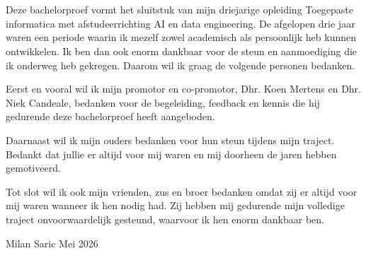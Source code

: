 
\chapter*{}%
\label{ch:voorwoord}


Deze bachelorproef vormt het sluitstuk van mijn driejarige opleiding Toegepaste informatica met afstudeerrichting AI en data engineering. De afgelopen drie jaar waren een periode waarin ik mezelf zowel academisch als persoonlijk heb kunnen ontwikkelen. Ik ben dan ook enorm dankbaar voor de steun en aanmoediging die ik onderweg heb gekregen. Daarom wil ik graag de volgende personen bedanken.

Eerst en vooral wil ik mijn promotor en co-promotor, Dhr. Koen Mertens en Dhr. Niek Candeale, bedanken voor de begeleiding, feedback en kennis die hij gedurende deze bachelorproef heeft aangeboden.

Daarnaast wil ik mijn ouders bedanken voor hun steun tijdens mijn traject. Bedankt dat jullie er altijd voor mij waren en mij doorheen de jaren hebben gemotiveerd.

Tot slot wil ik ook mijn vrienden, zus en broer bedanken omdat zij er altijd voor mij waren wanneer ik hen nodig had. Zij hebben mij gedurende mijn volledige traject onvoorwaardelijk gesteund, waarvoor ik hen enorm dankbaar ben.

Milan Saric
Mei 2026